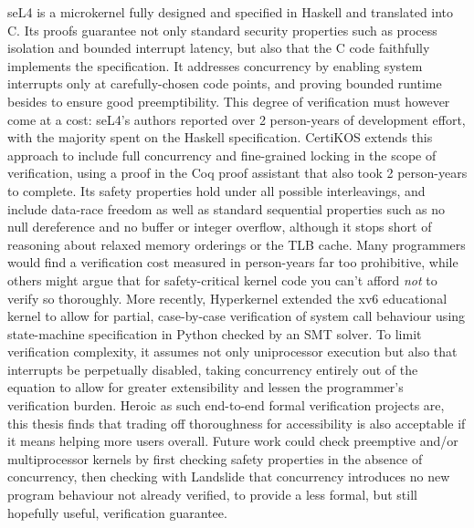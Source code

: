 seL4 \cite{sel4} is a microkernel fully designed and specified in Haskell and translated into C.
Its proofs guarantee not only standard security properties such as process isolation and bounded interrupt latency,
but also that the C code faithfully implements the specification.
It addresses concurrency by enabling system interrupts only at carefully-chosen code points,
and proving bounded runtime besides to ensure good preemptibility.
This degree of verification must however come at a cost:
seL4's authors reported over 2 person-years of development effort, with the majority spent on the Haskell specification.
%
CertiKOS \cite{certikos} extends this approach to include full concurrency and fine-grained locking
in the scope of verification,
using a proof in the Coq proof assistant
\cite{coq}
that also took 2 person-years to complete.
Its safety properties hold under all possible interleavings,
and include data-race freedom as well as standard sequential properties
such as no null dereference and no buffer or integer overflow,
although it stops short of reasoning about relaxed memory orderings or the TLB cache.
Many programmers would find a verification cost measured in person-years far too prohibitive,
while others might argue that for safety-critical kernel code you can't afford {\em not} to verify so thoroughly.
%
More recently, Hyperkernel \cite{hyperkernel} extended the xv6 educational kernel \cite{xv6}
to allow for partial, case-by-case verification of system call behaviour using state-machine specification in Python
checked by an SMT solver.
To limit verification complexity, it assumes not only uniprocessor execution
but also that interrupts be perpetually disabled,
taking concurrency entirely out of the equation to allow for greater extensibility
and lessen the programmer's verification burden.
%
Heroic as such end-to-end formal verification projects are,
this thesis finds that trading off thoroughness for accessibility is also acceptable
if it means helping more users overall.
Future work could check preemptive and/or multiprocessor kernels
by first checking safety properties in the absence of concurrency,
then checking with Landslide that concurrency introduces no new program behaviour not already verified,
to provide a less formal, but still hopefully useful, verification guarantee.
%
